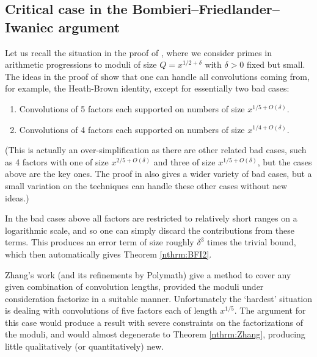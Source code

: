 \documentclass[10pt]{amsart}
\theoremstyle{plain}
\numberwithin{equation}{section}
\begin{document}
\subsection{Critical case in the Bombieri--Friedlander--Iwaniec argument}
%
%
%
%
Let us recall the situation in the proof of \cite{BFI3}, where we consider primes in arithmetic progressions to moduli of size $Q=x^{1/2+\delta}$ with $\delta>0$ fixed but small. The ideas in the proof of \cite{BFI3} show that one can handle all convolutions coming from, for example, the Heath-Brown identity, except for essentially two bad cases:
\begin{enumerate}
\item Convolutions of 5 factors each supported on numbers of size $x^{1/5+O(\delta)}$.
\item Convolutions of 4 factors each supported on numbers of size $x^{1/4+O(\delta)}$.
\end{enumerate}
(This is actually an  over-simplification as there are other related bad cases, such as 4 factors with one of size $x^{2/5+O(\delta)}$ and three of size $x^{1/5+O(\delta)}$, but the cases above are the key ones. The proof in \cite{BFI3} also gives a wider variety of bad cases, but a small variation on the techniques can handle these other cases without new ideas.)

In the bad cases above all factors are restricted to relatively short ranges on a logarithmic scale, and so one can simply discard the contributions from these terms. This produces an error term of size roughly $\delta^3$ times the trivial bound, which then automatically gives Theorem \ref{nthrm:BFI2}.

Zhang's work (and its refinements by Polymath) give a method to cover any given combination of convolution lengths, provided the moduli under consideration factorize in a suitable manner. Unfortunately the `hardest' situation is dealing with convolutions of five factors each of length $x^{1/5}$. The argument for this case would produce a result with severe constraints on the factorizations of the moduli, and would almost degenerate to Theorem \ref{nthrm:Zhang}, producing little qualitatively (or quantitatively) new.
%
%
%
%
\end{document}
